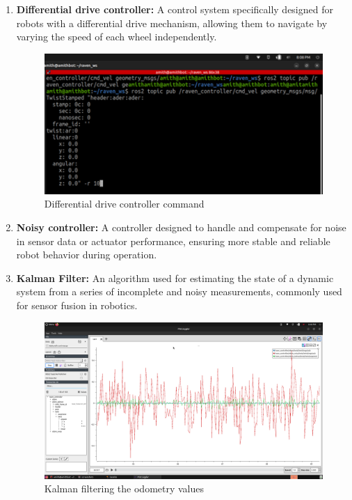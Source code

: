 {\begin{enumerate}[label=\textbf{\arabic*}., leftmargin=*]
		
		\item \textbf{Differential drive controller:} A control system specifically designed for robots with a
		differential drive mechanism, allowing them to navigate by varying the speed of each wheel
		independently.
		
		\begin{figure}[H]
			\centering
			\includegraphics{images/Content/Differential_controller_drive}
			\caption{Differential drive controller command}
			\label{fig:differentialcontrollerdrive}
		\end{figure}
		
		
		\item \textbf{Noisy controller:} A controller designed to handle and compensate for noise in sensor data
		or actuator performance, ensuring more stable and reliable robot behavior during operation.
		
		\item \textbf{Kalman Filter:} An algorithm used for estimating the state of a dynamic system from a
		series of incomplete and noisy measurements, commonly used for sensor fusion in robotics.
		
		\begin{figure}[H]
			\centering
			\includegraphics[scale=0.15]{images/Content/KALMAN_MOTION_FILTER}
			\caption{Kalman filtering the odometry values}
			\label{fig:kalmanmotionfilter}
		\end{figure}
		

\end{enumerate}}

